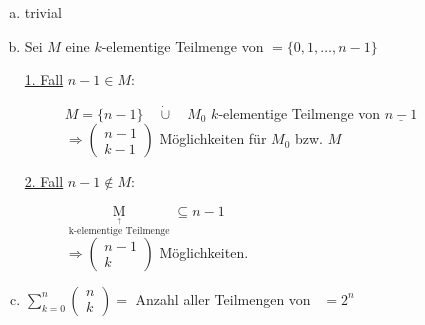 \bws
\begin{enumerate}[a) ]
	\item trivial
	\item Sei $M$ eine $k$-elementige Teilmenge von \n$=\{0,1,\dotsc,n-1\}$
	\begin{description}
		\item[\underline{1. Fall} $n-1\in M:$] $M=\{n-1\} \quad \dot{\cup} \quad M_{0}$ $k$-elementige Teilmenge von $\underline{n-1}$\\
			$\Rightarrow \begin{pmatrix} n-1 \\ k-1 \end{pmatrix}$ Möglichkeiten für $M_{0}$ bzw. $M$
		\item[\underline{2. Fall} $n-1 \notin M:$] $\mathop{M}\limits_{\mathop{k\textrm{-elementige Teilmenge}}\limits^{\uparrow}} \subseteq n-1$ \\
			$\Rightarrow \begin{pmatrix} n-1 \\ k \end{pmatrix}$ Möglichkeiten.
	\end{description}
	\item $\sum\limits^{n}_{k=0}\begin{pmatrix} n \\ k \end{pmatrix} =$ Anzahl aller Teilmengen von \n  \, $= 2^{n}$
\end{enumerate}

